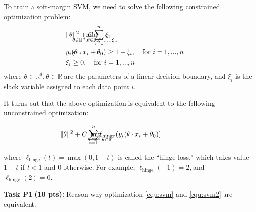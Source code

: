 \documentclass[12pt]{article}
\begin{document}
To train a soft-margin SVM, we need to solve the following constrained optimization problem:
\begin{subequations}
    \label{equ:svm}
	\begin{align}
    & \underset{\theta\in\mathbb{R}^d,\theta\in\mathbb{R},
\xi_1,...,\xi_n}{\text{min~~~}}
	&& \hspace{-3cm}\|\theta\|^2+C\sum_{i=1}^n\xi_i\\
	& \text{s.t.~~~}
	&& \hspace{-3cm}y_i(\theta\cdot x_i+\theta_0)\geq 1-\xi_i,\quad\text{for $i=1,...,n$}\\
	&&& \hspace{-3cm}\xi_i\geq 0,\quad\text{for $i=1,...,n$}
	\end{align}
\end{subequations}
where $\theta\in\mathbb{R}^d,\theta\in\mathbb{R}$ are the parameters of a linear decision boundary, and $\xi_i$ is the slack variable assigned to each data point $i$.

It turns out that the above optimization is equivalent to the following unconstrained optimization:
    
\begin{align}
    & \underset{\theta\in\mathbb{R}^d,\theta\in\mathbb{R}}{\text{min~~~}}
	&& \hspace{-3cm}\|\theta\|^2+C\sum_{i=1}^n\ell_{\mathrm{hinge}}(y_i(\theta\cdot x_i+\theta_0))\label{equ:svm2}
\end{align}

where  $\ell_{\mathrm{hinge}}(t)=\max(0,1-t)$ is called the ``hinge loss,'' which takes value $1-t$ if $t<1$ and 0 otherwise. For example, $\ell_{\mathrm{hinge}}(-1)=2$, and $\ell_{\mathrm{hinge}}(2)=0$. 



\textbf{Task P1 (10 pts):} Reason why optimization \eqref{equ:svm} and \eqref{equ:svm2} are equivalent. 
\end{document}
